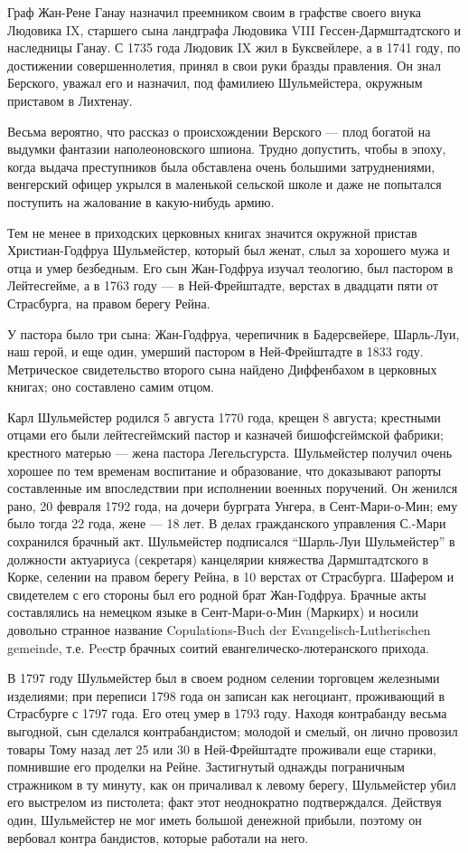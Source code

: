 \documentclass[
  oneside,
  12pt,
  titlepage]{book}
\begin{document}
Граф Жан-Рене Ганау назначил преемником своим в графстве своего внука Людовика IX, старшего сына ландграфа Людовика VIII Гессен-Дармштадтского и наследницы Ганау. С 1735 года Людовик IX жил в Буксвейлере, а в 1741 году, по достижении совершеннолетия, принял в свои руки бразды правления. Он знал Берского, уважал его и назначил, под фамилиею Шульмейстера, окружным приставом в Лихтенау.

Весьма вероятно, что рассказ о происхождении Верского --- плод богатой на выдумки фантазии наполеоновского шпиона. Трудно допустить, чтобы в эпоху, когда выдача преступников была обставлена очень большими затруднениями, венгерский офицер укрылся в маленькой сельской школе и даже не попытался поступить на жалование в какую-нибудь армию.

Тем не менее в приходских церковных книгах значится окружной пристав Христиан-Годфруа Шульмейстер, который был женат, слыл за хорошего мужа и отца и умер безбедным. Его сын Жан-Годфруа изучал теологию, был пастором в Лейтесгейме, а в 1763 году --- в Ней-Фрейштадте, верстах в двадцати пяти от Страсбурга, на правом берегу Рейна.

У пастора было три сына: Жан-Годфруа, черепичник в Бадерсвейере, Шарль-Луи, наш герой, и еще один, умерший пастором в Ней-Фрейштадте в 1833 году. Метрическое свидетельство второго сына найдено Диффенбахом в церковных книгах; оно составлено самим отцом.

Карл Шульмейстер родился 5 августа 1770 года, крещен 8 августа; крестными отцами его были лейтесгеймский пастор и казначей бишофсгеймской фабрики; крестного матерью --- жена пастора Легельсгурста. Шульмейстер получил очень хорошее по тем временам воспитание и образование, что доказывают рапорты составленные им впоследствии при исполнении военных поручений. Он женился рано, 20 февраля 1792 года, на дочери бурграта Унгера, в Сент-Мари-о-Мин; ему было тогда 22 года, жене --- 18 лет. В делах гражданского управления С.-Мари сохранился брачный акт. Шульмейстер подписался ``Шарль-Луи Шульмейстер'' в должности актуариуса (секретаря) канцелярии княжества Дармштадтского в Корке, селении на правом берегу Рейна, в 10 верстах от Страсбурга. Шафером и свидетелем с его стороны был его родной брат Жан-Годфруа. Брачные акты составлялись на немецком языке в Сент-Мари-о-Мин (Маркирх) и носили довольно странное название Copulations-Buch der Evangelisch-Lutherischen gemeinde, т.е. Peeстр брачных соитий евангелическо-лютеранского прихода.

В 1797 году Шульмейстер был в своем родном селении торговцем железными изделиями; при переписи 1798 года он записан как негоциант, проживающий в Страсбурге с 1797 года. Его отец умер в 1793 году. Находя контрабанду весьма выгодной, сын сделался контрабандистом; молодой и смелый, он лично провозил товары Тому назад лет 25 или 30 в Ней-Фрейштадте проживали еще старики, помнившие его проделки на Рейне. Застигнутый однажды пограничным стражником в ту минуту, как он причаливал к левому берегу, Шульмейстер убил его выстрелом из пистолета; факт этот неоднократно подтверждался. Действуя один, Шульмейстер не мог иметь большой денежной прибыли, поэтому он вербовал контра бандистов, которые работали на него.
\end{document}
